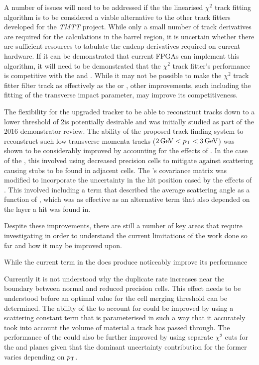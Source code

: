 A number of issues will need to be addressed if the the linearised $\chi^{2}$ track fitting algorithm is to be considered a viable alternative to the other track fitters developed for the \emph{TMTT} project.
While only a small number of track derivatives are required for the calculations in the barrel region, it is uncertain whether there are sufficient resources to tabulate the endcap derivatives required on current hardware.
If it can be demonstrated that current FPGAs can implement this algorithm, it will need to be demonstrated that the $\chi^{2}$ track fitter's performance is competitive with the \KF and \LR.
While it may not be possible to make the $\chi^{2}$ track fitter filter track as effectively as the \KF or \LR , other improvements, such including the fitting of the transverse impact parameter, may improve its competitiveness.



The flexibility for the upgraded tracker to be able to reconstruct tracks down to a lower \pT threshold of 2\GeV is potentially desirable and was initially studied as part of the 2016 demonstrator review.
The ability of the proposed track finding system to reconstruct such low transverse momenta tracks ($2\,\text{Ge\hspace{-.08em}V} < p_{\mathrm{T}} < 3\,\text{Ge\hspace{-.08em}V}$) was shown to be considerably improved by accounting for the effects of \MS. 
In the case of the \HT, this involved using decreased precision \HT cells to mitigate against scattering causing stubs to be found in adjacent cells.
The \KF's covariance matrix was modified to incorporate the uncertainty in the hit position cased by the effects of \MS.
This involved including a term that described the average scattering angle as a function of \pT, which was as effective as an alternative term that also depended on the layer a hit was found in.

Despite these improvements, there are still a number of key areas that require investigating in order to understand the current limitations of the work done so far and how it may be improved upon.

While the current \MS term in the \KF does produce noticeably improve its performance

Currently it is not understood why the duplicate rate increases near the boundary between normal and reduced precision \HT cells.
This effect needs to be understood before an optimal value for the cell merging threshold can be determined.
The ability of the \KF to account for \MS could be improved by using a scattering constant term that is parameterised in such a way that it accurately took into account the volume of material a track has passed through.
The performance of the \KF could also be further improved by using separate \KF $\chi^{2}$ cuts for the \rphi and \rz planes given that the dominant uncertainty contribution for the former varies depending on $p_{\mathrm{T}}$.

